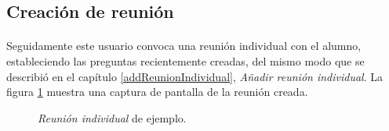   \subsection{Creación de reunión}

  \paragraph{}Seguidamente este usuario convoca una reunión individual con el
  alumno, estableciendo las preguntas recientemente creadas, del mismo modo que
  se describió en el capítulo \ref{addReunionIndividual},
  \textit{Añadir reunión individual}. La figura \ref{ejemploReunionIndividual}
  muestra una captura de pantalla de la reunión creada.

  \begin{figure}[!ht]
    \begin{center}
      \caption{\textit{Reunión individual} de ejemplo.}
      \label{ejemploReunionIndividual}
    \end{center}
  \end{figure}
